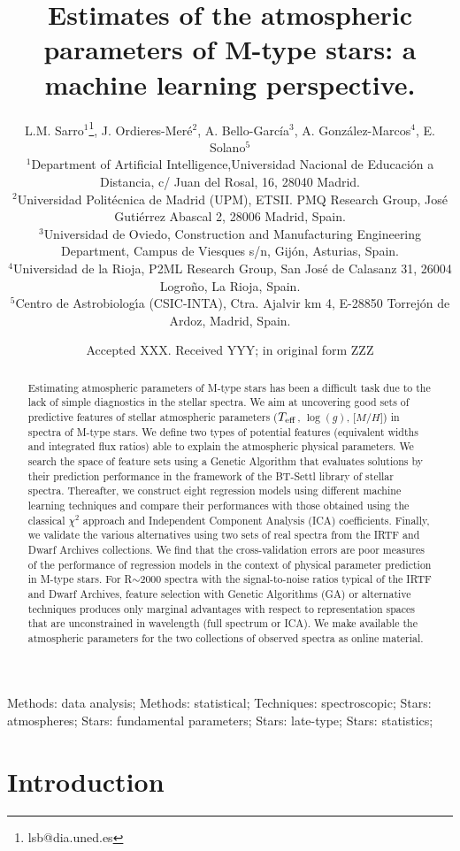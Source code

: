 \documentclass[a4paper,fleqn,usenatbib]{mnras}
\title[Estimating the atmospheric parameters of M-type
  stars]{Estimates of the atmospheric parameters of M-type stars: a
  machine learning perspective.}
\author[L. M. Sarro et al.]  {
  L.M. Sarro$^{1}$\thanks{lsb@dia.uned.es}, J. Ordieres-Mer\'e$^{2}$,
  A. Bello-Garc\'ia$^{3}$, A. Gonz\'alez-Marcos$^{4}$, E. Solano$^{5}$
  \\ $^{1}$Department of Artificial Intelligence,Universidad Nacional
  de Educaci\'{o}n a Distancia, c/ Juan del Rosal, 16, 28040
  Madrid.\\ $^{2}$Universidad Polit\'{e}cnica de Madrid (UPM),
  ETSII. PMQ Research Group, Jos\'{e} Guti\'{e}rrez Abascal 2, 28006
  Madrid, Spain. \\ $^{3}$Universidad de Oviedo, Construction and
  Manufacturing Engineering Department, Campus de Viesques s/n,
  Gij\'{o}n, Asturias, Spain. \\ $^{4}$Universidad de la Rioja, P2ML
  Research Group, San Jos\'{e} de Calasanz 31, 26004 Logro\~{n}o, La
  Rioja, Spain. \\ $^{5}$Centro de Astrobiolog\'{\i}a (CSIC-INTA),
  Ctra. Ajalvir km 4, E-28850 Torrej\'{o}n de Ardoz, Madrid,
  Spain.\\ } \date{Accepted XXX. Received YYY; in original form ZZZ}
\newcommand{\defindent}{\setlength{\parindent}{4ex}}
\begin{document}
 
\label{firstpage}
\pagerange{\pageref{firstpage}--\pageref{lastpage}}
\maketitle

\begin{abstract}
    Estimating atmospheric parameters of M-type stars has been a
    difficult task due to the lack of simple diagnostics in the
    stellar spectra.  We aim at uncovering good sets of predictive
    features of stellar atmospheric parameters ($T_{\rm eff}$,
    $\log(g)$, [$M/H$]) in spectra of M-type stars. We define two
    types of potential features (equivalent widths and integrated flux
    ratios) able to explain the atmospheric physical parameters. We
    search the space of feature sets using a Genetic Algorithm that
    evaluates solutions by their prediction performance in the
    framework of the BT-Settl library of stellar spectra. Thereafter,
    we construct eight regression models using different machine
    learning techniques and compare their performances with those
    obtained using the classical $\chi^2$ approach and Independent
    Component Analysis (ICA) coefficients. Finally, we validate the
    various alternatives using two sets of real spectra from the IRTF
    and Dwarf Archives collections.  We find that the cross-validation
    errors are poor measures of the performance of regression models
    in the context of physical parameter prediction in M-type
    stars. For R$\sim$2000 spectra with the signal-to-noise ratios
    typical of the IRTF and Dwarf Archives, feature selection with
    Genetic Algorithms (GA) or alternative techniques produces only
    marginal advantages with respect to representation spaces that are
    unconstrained in wavelength (full spectrum or ICA). We make
    available the atmospheric parameters for the two collections of
    observed spectra as online material.
    
\end{abstract}


\begin{keywords}
Methods: data analysis; Methods: statistical;
     Techniques: spectroscopic; Stars: atmospheres; Stars: fundamental
     parameters; Stars: late-type; Stars: statistics;
\end{keywords}

%

\defindent{}

\section{Introduction}
\label{sec:intro}

\end{document}
